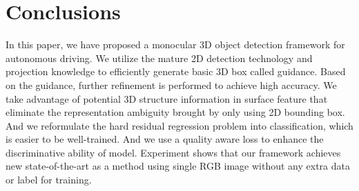 \documentclass[10pt,twocolumn,letterpaper]{article}
\begin{document}
\section{Conclusions}
In this paper, we have proposed a monocular 3D object detection framework for autonomous driving. We utilize the mature 2D detection technology and projection knowledge to efficiently generate basic 3D box called guidance. Based on the guidance, further refinement is performed to achieve high accuracy. We take advantage of potential 3D structure information in surface feature that eliminate the representation ambiguity brought by only using 2D bounding box. And we reformulate the hard residual regression problem into classification, which is easier to be well-trained. And we use a quality aware loss to enhance the discriminative ability of model. Experiment shows that our framework achieves new state-of-the-art as a method using single RGB image without any extra data or label for training.

{\small


}
\end{document}
